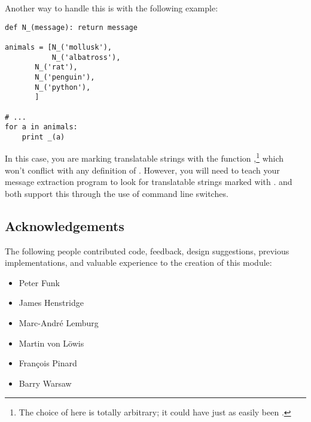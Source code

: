 Another way to handle this is with the following example:

\begin{verbatim}
def N_(message): return message

animals = [N_('mollusk'),
           N_('albatross'),
	   N_('rat'),
	   N_('penguin'),
	   N_('python'),
	   ]

# ...
for a in animals:
    print _(a)
\end{verbatim}

In this case, you are marking translatable strings with the function
,\footnote{The choice of  here is totally
arbitrary; it could have just as easily been
.
} which won't conflict with any definition of
\function{_()}.  However, you will need to teach your message extraction
program to look for translatable strings marked with .
 and  both support this through the
use of command line switches.

\subsection{Acknowledgements}

The following people contributed code, feedback, design suggestions,
previous implementations, and valuable experience to the creation of
this module:

\begin{itemize}
    \item Peter Funk
    \item James Henstridge
    \item Marc-Andr\'e Lemburg
    \item Martin von L\"owis
    \item Fran\c cois Pinard
    \item Barry Warsaw
\end{itemize}
